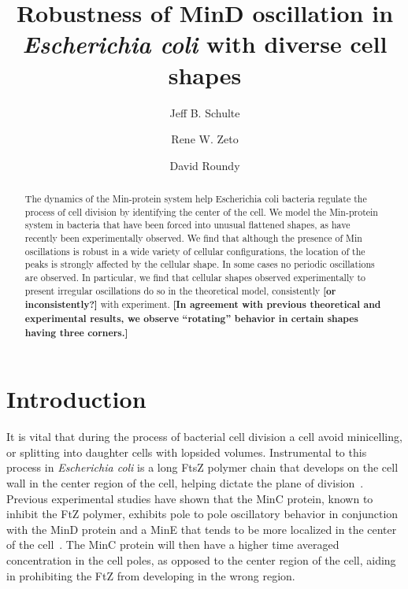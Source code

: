 \documentclass[letterpaper,twocolumn,amsmath,amssymb,pre]{revtex4-1}
\newcommand{\red}[1]{{\bf \color{red} #1}}
\newcommand{\fixme}[1]{\red{[#1]}}
\begin{document}
\title{Robustness of MinD oscillation in \emph{Escherichia coli} with
  diverse cell shapes}

\author{Jeff B. Schulte}
\author{Rene W. Zeto}
\author{David Roundy}

\begin{abstract}
  The dynamics of the Min-protein system help Escherichia coli
  bacteria regulate the process of cell division by identifying the
  center of the cell.  We model the Min-protein system in bacteria
  that have been forced into unusual flattened shapes, as have
  recently been experimentally observed.  We find that although the
  presence of Min oscillations is robust in a wide variety of cellular
  configurations, the location of the peaks is strongly affected by
  the cellular shape.  In some cases no periodic oscillations are
  observed.  In particular, we find that cellular shapes observed
  experimentally to present irregular oscillations do so in the
  theoretical model, consistently \fixme{or inconsistently?} with
  experiment.  \fixme{In agreement with previous theoretical and
    experimental results, we observe ``rotating'' behavior in certain
    shapes having three corners.}
\end{abstract}

\maketitle

\section{Introduction}
It is vital that during the process of bacterial cell division a cell
avoid minicelling, or splitting into daughter cells with lopsided
volumes.  Instrumental to this process in \emph{Escherichia coli} is a
long FtsZ polymer chain that develops on the cell wall in the center
region of the cell, helping dictate the plane of
division~\cite{adams2009bacterial, lutkenhaus2007assembly}. Previous
experimental studies have shown that the MinC protein, known to
inhibit the FtZ polymer\cite{shen2010examination}, exhibits pole to
pole oscillatory behavior in conjunction with the MinD protein and a
MinE that tends to be more localized in the center of the
cell~\cite{hu1999topological, fu2001mine, shapiro2009and, yu1999ftsz,
  raskin1999rapid}. The MinC protein will then have a higher time
averaged concentration in the cell poles, as opposed to the center
region of the cell, aiding in prohibiting the FtZ from developing in
the wrong region.
\end{document}

